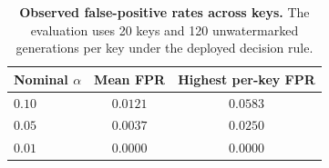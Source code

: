 \begin{table}[H]
\centering
\small
\renewcommand{\arraystretch}{0.8}
\begin{tabular}{lcc}
\toprule
Nominal $\alpha$ & Mean FPR & Highest per-key FPR \\
\midrule
$0.10$ & $0.0121$ & $0.0583$ \\
$0.05$ & $0.0037$ & $0.0250$ \\
$0.01$ & $0.0000$ & $0.0000$ \\
\bottomrule
\end{tabular}
\setlength{\abovecaptionskip}{3pt}
\caption{\textbf{Observed false-positive rates across keys.} The evaluation uses 20 keys and
120 unwatermarked generations per key under the deployed decision rule.}
\label{tab:validity}
\end{table}
